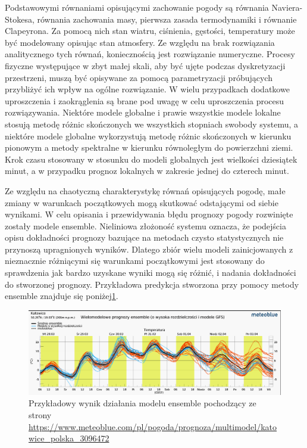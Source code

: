 Podstawowymi równaniami opisującymi zachowanie pogody są równania Naviera-Stokesa, równania zachowania
masy, pierwsza zasada termodynamiki i równanie Clapeyrona. Za pomocą nich stan wiatru, ciśnienia,
gęstości, temperatury może być modelowany opisując stan atmosfery. Ze względu na brak rozwiązania
analitycznego tych równań, koniecznością jest rozwiązanie numeryczne. Procesy fizyczne występujące
w zbyt małej skali, aby być ujęte podczas dyskretyzacji przestrzeni, muszą być opisywane za pomocą
parametryzacji próbujących przybliżyć ich wpływ na ogólne rozwiązanie. W wielu przypadkach 
dodatkowe uproszczenia i zaokrąglenia są brane pod uwagę w celu uproszczenia procesu
rozwiązywania. Niektóre modele globalne i prawie wszystkie modele lokalne stosują 
metodę różnic skończonych we wszystkich stopniach swobody systemu, a niektóre modele globalne
wykorzystują metodę różnic skończonych w kierunku pionowym a metody spektralne w kierunku równoległym
do powierzchni ziemi. Krok czasu stosowany w stosunku do modeli globalnych jest wielkości dziesiątek
minut, a w przypadku prognoz lokalnych w zakresie jednej do czterech minut.

Ze względu na chaotyczną charakterystykę równań opisujących pogodę, małe zmiany w warunkach początkowych
mogą skutkować odstającymi od siebie wynikami. W celu opisania i przewidywania błędu prognozy pogody 
rozwinięte zostały modele ensemble. Nieliniowa złożoność systemu oznacza, że podejścia opisu
dokładności prognozy bazujące na metodach czysto statystycznych nie przynoszą upragnionych wyników.
Dlatego zbiór wielu modeli zainicjowanych z nieznacznie różniącymi się warunkami początkowymi
jest stosowany do sprawdzenia jak bardzo uzyskane wyniki mogą się różnić, i nadania dokładności do 
stworzonej prognozy. Przykładowa predykcja stworzona przy pomocy metody ensemble znajduje się 
poniżej\ref{nwp-ensemble}.

\begin{figure}[H]
    \centering
    \includegraphics[width=\textwidth]{images/multimodel.png}
    \caption{Przykładowy wynik działania modelu ensemble pochodzący ze strony 
        \url{https://www.meteoblue.com/pl/pogoda/prognoza/multimodel/katowice_polska_3096472}}
    \label{nwp-ensemble}
\end{figure}

